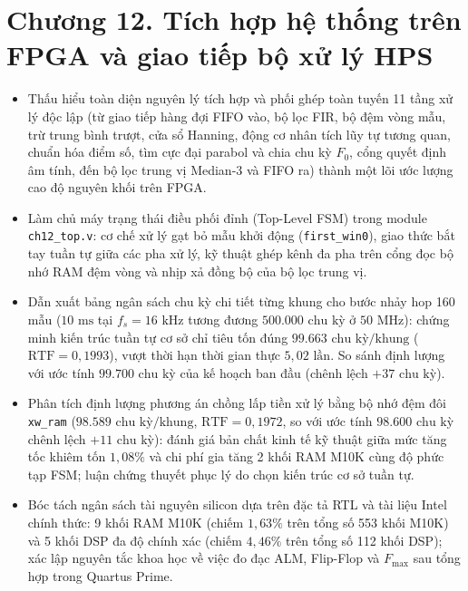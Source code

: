 \clearpage
{}
\section*{Chương 12. Tích hợp hệ thống trên FPGA và giao tiếp bộ xử lý HPS}

\begin{learningobj}
\begin{itemize}
    \item Thấu hiểu toàn diện nguyên lý tích hợp và phối ghép toàn tuyến 11 tầng xử lý độc lập (từ giao tiếp hàng đợi FIFO vào, bộ lọc FIR, bộ đệm vòng mẫu, trừ trung bình trượt, cửa sổ Hanning, động cơ nhân tích lũy tự tương quan, chuẩn hóa điểm số, tìm cực đại parabol và chia chu kỳ $F_0$, cổng quyết định âm tính, đến bộ lọc trung vị Median-3 và FIFO ra) thành một lõi ước lượng cao độ nguyên khối trên FPGA.
    \item Làm chủ máy trạng thái điều phối đỉnh (Top-Level FSM) trong module \texttt{ch12\_top.v}: cơ chế xử lý gạt bỏ mẫu khởi động (\texttt{first\_win0}), giao thức bắt tay tuần tự giữa các pha xử lý, kỹ thuật ghép kênh đa pha trên cổng đọc bộ nhớ RAM đệm vòng và nhịp xả đồng bộ của bộ lọc trung vị.
    \item Dẫn xuất bảng ngân sách chu kỳ chi tiết từng khung cho bước nhảy hop 160 mẫu ($10\text{ ms}$ tại $f_s = 16\text{ kHz}$ tương đương $500.000\text{ chu kỳ}$ ở $50\text{ MHz}$): chứng minh kiến trúc tuần tự cơ sở chỉ tiêu tốn đúng $99.663\text{ chu kỳ/khung}$ ($\text{RTF} = 0{,}1993$), vượt thời hạn thời gian thực $5{,}02\text{ lần}$. So sánh định lượng với ước tính $99.700\text{ chu kỳ}$ của kế hoạch ban đầu (chênh lệch $+37\text{ chu kỳ}$).
    \item Phân tích định lượng phương án chồng lấp tiền xử lý bằng bộ nhớ đệm đôi \texttt{xw\_ram} ($98.589\text{ chu kỳ/khung}$, $\text{RTF} = 0{,}1972$, so với ước tính $98.600\text{ chu kỳ}$ chênh lệch $+11\text{ chu kỳ}$): đánh giá bản chất kinh tế kỹ thuật giữa mức tăng tốc khiêm tốn $1{,}08\%$ và chi phí gia tăng 2 khối RAM M10K cùng độ phức tạp FSM; luận chứng thuyết phục lý do chọn kiến trúc cơ sở tuần tự.
    \item Bóc tách ngân sách tài nguyên silicon dựa trên đặc tả RTL và tài liệu Intel chính thức: 9 khối RAM M10K (chiếm $1{,}63\%$ trên tổng số 553 khối M10K) và 5 khối DSP đa độ chính xác (chiếm $4{,}46\%$ trên tổng số 112 khối DSP); xác lập nguyên tắc khoa học về việc đo đạc ALM, Flip-Flop và $F_{\max}$ sau tổng hợp trong Quartus Prime.

\end{itemize}
\end{learningobj}
